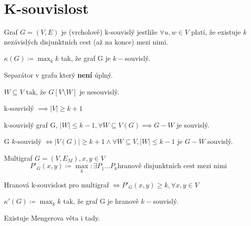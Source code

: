 \documentclass[../main.tex]{subfiles}
\begin{document}
\section{K-souvislost}

\begin{definition}
    Graf $G=(V,E)$ je (vrcholově) k-souvislý jestliže $\forall u,w\in V$ platí, 
    že existuje $k$ nezávislých disjunktních cest (až na konce) mezi nimi. 
\end{definition}


\begin{definition}
    $\kappa(G) \coloneq \max_k k$ tak, že graf G je $k-$souvislý.
\end{definition}


\begin{definition}
    Separátor v grafu který \textbf{není} úplný. 

    $W\subseteq V$ tak, že $G[V\setminus W]$ je nesouvislý.
\end{definition}


\begin{remark}
    k-souvislý $\implies |V| \geq k+1$
\end{remark}

\begin{remark}
    k-souvislý graf G, $|W|\leq k-1, \forall W \subseteq V(G) \implies G-W$ je souvislý.
\end{remark}

\begin{theorem}
    G $k$-souvislý $\Leftrightarrow |V(G)|\geq k + 1 \wedge \forall W\subseteq V, |W|\leq k-1$ je $G-W$ souvislý.
\end{theorem}






\begin{definition}
    Multigraf $G=(V,E_M), x,y\in V$ \begin{equation*}
        P'_G(x,y) \coloneq \max_k: \exists P_1... P_k \text{hranově disjunktních cest mezi nimi}
    \end{equation*}
\end{definition}

\begin{definition}
    Hranová k-souvislost pro multigraf $\Leftrightarrow P'_G (x,y) \geq k, \forall x,y \in V$
\end{definition}

\begin{definition}
    $\kappa'(G) \coloneq \max_k k$ tak, že graf G je hranově $k-$souvislý.
\end{definition}


Existuje Mengerova věta i tady. 
\end{document}
